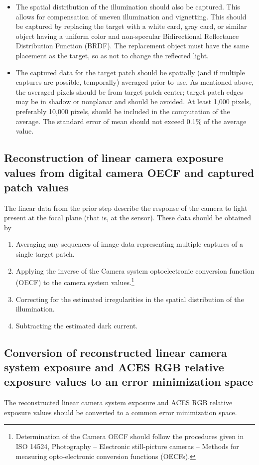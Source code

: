 \begin{itemize}
	\item The spatial distribution of the illumination should also be captured. This allows for compensation of uneven illumination and vignetting. This should be captured by replacing the target with a white card, gray card, or similar object having a uniform color and non-specular Bidirectional Reflectance Distribution Function (BRDF). The replacement object must have the same placement as the target, so as not to change the reflected light.
	\item The captured data for the target patch should be spatially (and if multiple captures are possible, temporally) averaged prior to use. As mentioned above, the averaged pixels should be from target patch center; target patch edges may be in shadow or nonplanar and should be avoided. At least 1,000 pixels, preferably 10,000 pixels, should be included in the computation of the average. The standard error of mean should not exceed 0.1\% of the average value.	
\end{itemize}

\subsection*{Reconstruction of linear camera exposure values from digital camera OECF and captured patch values}
The linear data from the prior step describe the response of the camera to light present at the focal plane (that is, at the sensor). These data should be obtained by 

\begin{enumerate}
	\item Averaging any sequences of image data representing multiple captures of a single target patch.
	\item Applying the inverse of the Camera system optoelectronic conversion function (OECF) to the camera system values.\footnote{Determination of the Camera OECF should follow the procedures given in ISO 14524, Photography -- Electronic still-picture cameras -- Methods for measuring opto-electronic conversion functions (OECFs).} 
	\item Correcting for the estimated irregularities in the spatial distribution of the illumination.
	\item Subtracting the estimated dark current.
\end{enumerate}

\subsection*{Conversion of reconstructed linear camera system exposure and ACES RGB relative exposure values to an error minimization space}
The reconstructed linear camera system exposure and ACES RGB relative exposure values should be converted to a common error minimization space. 

